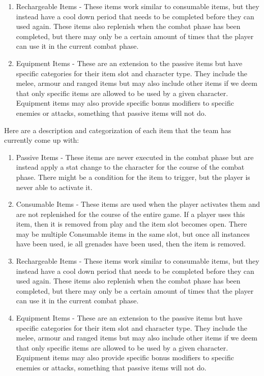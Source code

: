 \documentclass[12pt, titlepage]{article}
\begin{document}
\begin{enumerate}
\begin{enumerate}
	\item Rechargeable Items - These items work similar to consumable items, but they instead have a cool down period that needs to be completed before they can used again. These items also replenish when the combat phase has been completed, but there may only be a certain amount of times that the player can use it in the current combat phase.
	\item Equipment Items - These are an extension to the passive items but have specific categories for their item slot and character type. They include the melee, armour and ranged items but may also include other items if we deem that only specific items are allowed to be used by a given character. Equipment items may also provide specific bonus modifiers to specific enemies or attacks, something that passive items will not do.
	\end{enumerate}
	Here are a description and categorization of each item that the team has currently come up with:
	\begin{enumerate}
	\item Passive Items - These items are never executed in the combat phase but are instead apply a stat change to the character for the course of the combat phase. There might be a condition for the item to trigger, but the player is never able to activate it.
	\item Consumable Items - These items are used when the player activates them and are not replenished for the course of the entire game. If a player uses this item, then it is removed from play and the item slot becomes open. There may be multiple Consumable items in the same slot, but once all instances have been used, ie all grenades have been used, then the item is removed.
	\item Rechargeable Items - These items work similar to consumable items, but they instead have a cool down period that needs to be completed before they can used again. These items also replenish when the combat phase has been completed, but there may only be a certain amount of times that the player can use it in the current combat phase.
	\item Equipment Items - These are an extension to the passive items but have specific categories for their item slot and character type. They include the melee, armour and ranged items but may also include other items if we deem that only specific items are allowed to be used by a given character. Equipment items may also provide specific bonus modifiers to specific enemies or attacks, something that passive items will not do.

\end{enumerate}
\end{enumerate}
\end{document}
